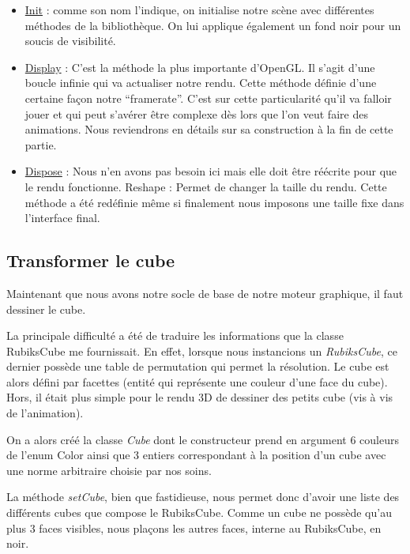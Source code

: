 \begin{itemize}
    \item \underline{Init} : comme son nom l’indique, on initialise notre scène avec différentes méthodes de la bibliothèque. On lui applique également un fond noir pour un soucis de visibilité.

    \item \underline{Display} : C’est la méthode la plus importante d’OpenGL. Il s’agit d’une boucle infinie qui va actualiser notre rendu. Cette méthode définie d’une certaine façon notre “framerate”.
C’est sur cette particularité qu’il va falloir jouer et qui peut s’avérer être complexe dès lors que l’on veut faire des animations. Nous reviendrons en détails sur sa construction à la fin de cette partie.

\item \underline{Dispose}  : Nous n’en avons pas besoin ici mais elle doit être réécrite pour que le rendu fonctionne.
Reshape : Permet de changer la taille du rendu. Cette méthode a été redéfinie même si finalement nous imposons une taille fixe dans l’interface final.

\end{itemize}

\subsection{Transformer le cube}
Maintenant que nous avons notre socle de base de notre moteur graphique, il faut dessiner le cube.

La principale difficulté a été de traduire les informations que la classe RubiksCube me fournissait. En effet, lorsque nous instancions un \textit{RubiksCube}, ce dernier possède une table de permutation qui permet la résolution. Le cube est alors défini par facettes (entité qui représente une couleur d’une face du cube). Hors, il était plus simple pour le rendu 3D de dessiner des petits cube (vis à vis de l’animation).

On a alors créé la classe \textit{Cube} dont le constructeur prend en argument 6 couleurs de l’enum Color ainsi que 3 entiers correspondant à la position d’un cube avec une norme arbitraire choisie par nos soins.

La méthode \textit{setCube}, bien que fastidieuse, nous permet donc d’avoir une liste des différents cubes que compose le RubiksCube. Comme un cube ne possède qu’au plus 3 faces visibles, nous plaçons les autres faces, interne au RubiksCube, en noir.


